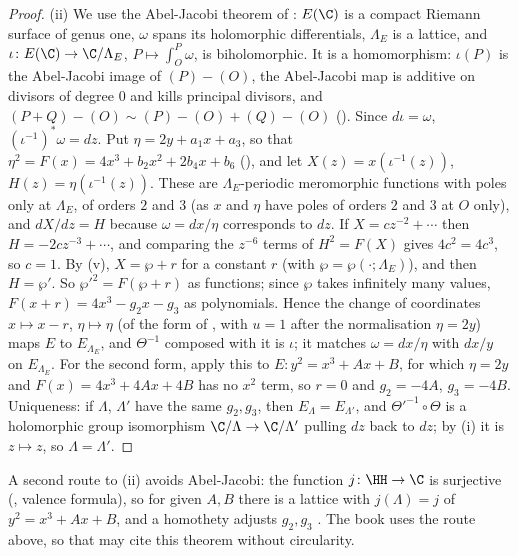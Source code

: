 \begin{proof}
(ii) We use the Abel-Jacobi theorem of : $E(\C)$ is a compact Riemann surface of genus one, $\omega$ spans its holomorphic differentials, $\Lambda_E$ is a lattice, and
$\iota\colon E(\C)\to\C/\Lambda_E$, $P\mapsto\int_O^P\omega$, is biholomorphic. It is a homomorphism: $\iota(P)$ is the Abel-Jacobi image of $(P)-(O)$, the Abel-Jacobi map is additive on
divisors of degree $0$ and kills principal divisors, and $(P+Q)-(O)\sim(P)-(O)+(Q)-(O)$ (). Since $d\iota=\omega$, $(\iota^{-1})^*\omega=dz$. Put
$\eta=2y+a_1x+a_3$, so that $\eta^2=F(x)=4x^3+b_2x^2+2b_4x+b_6$ (), and let $X(z)=x(\iota^{-1}(z))$, $H(z)=\eta(\iota^{-1}(z))$. These are $\Lambda_E$-periodic
meromorphic functions with poles only at $\Lambda_E$, of orders $2$ and $3$ (as $x$ and $\eta$ have poles of orders $2$ and $3$ at $O$ only), and $dX/dz=H$ because $\omega=dx/\eta$
corresponds to $dz$. If $X=cz^{-2}+\cdots$ then $H=-2cz^{-3}+\cdots$, and comparing the $z^{-6}$ terms of $H^2=F(X)$ gives $4c^2=4c^3$, so $c=1$. By (v),
$X=\wp+r$ for a constant $r$ (with $\wp=\wp(\cdot;\Lambda_E)$), and then $H=\wp'$. So $\wp'^2=F(\wp+r)$ as functions; since $\wp$ takes infinitely many values, $F(x+r)=4x^3-g_2x-g_3$ as
polynomials. Hence the change of coordinates $x\mapsto x-r$, $\eta\mapsto\eta$ (of the form of , with $u=1$ after the normalisation $\eta=2y$) maps $E$ to
$E_{\Lambda_E}$, and $\Theta^{-1}$ composed with it is $\iota$; it matches $\omega=dx/\eta$ with $dx/y$ on $E_{\Lambda_E}$. For the second form, apply this to $E\colon y^2=x^3+Ax+B$, for which
$\eta=2y$ and $F(x)=4x^3+4Ax+4B$ has no $x^2$ term, so $r=0$ and $g_2=-4A$, $g_3=-4B$. Uniqueness: if $\Lambda$, $\Lambda'$ have the same $g_2,g_3$, then $E_\Lambda=E_{\Lambda'}$, and $\Theta'^{-1}\circ\Theta$ is
a holomorphic group isomorphism $\C/\Lambda\to\C/\Lambda'$ pulling $dz$ back to $dz$; by (i) it is $z\mapsto z$, so $\Lambda=\Lambda'$.
\end{proof}

\noindent A second route to (ii) avoids Abel-Jacobi: the function $j\colon\HH\to\C$ is surjective (, valence formula), so for given $A,B$ there is a lattice with
$j(\Lambda)=j$ of $y^2=x^3+Ax+B$, and a homothety adjusts $g_2,g_3$ \cite[Section VI.5]{SilvermanAEC}. The book uses the route above, so that  may cite this
theorem without circularity.

